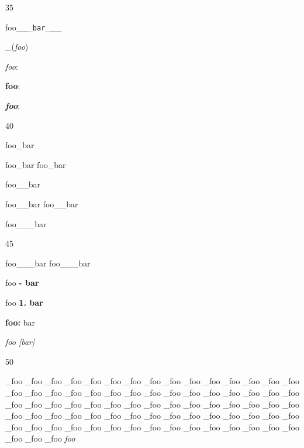 35

foo\_\_\texttt{\_bar\_}\_\_

\_(\emph{foo})

\emph{foo}:

\textbf{foo}:

\textbf{\emph{foo}}:

40

foo\_bar

foo\_bar foo\_bar

foo\_\_bar

foo\_\_bar foo\_\_bar

foo\_\_\_bar

45

foo\_\_\_bar foo\_\_\_bar

foo \textbf{- bar}

foo \textbf{1. bar}

\textbf{foo:} bar

\emph{foo [bar]}

50

\_foo
\_foo
\_foo
\_foo
\_foo
\_foo
\_foo
\_foo
\_foo
\_foo
\_foo
\_foo
\_foo
\_foo
\_foo
\_foo
\_foo
\_foo
\_foo
\_foo
\_foo
\_foo
\_foo
\_foo
\_foo
\_foo
\_foo
\_foo
\_foo
\_foo
\_foo
\_foo
\_foo
\_foo
\_foo
\_foo
\_foo
\_foo
\_foo
\_foo
\_foo
\_foo
\_foo
\_foo
\_foo
\_foo
\_foo
\_foo
\_foo
\_foo
\_foo
\_foo
\_foo
\_foo
\_foo
\_foo
\_foo
\_foo
\_foo
\_foo
\_foo
\_foo
\_foo
\_foo
\_foo
\_foo
\_foo
\_foo
\_foo
\_foo
\_foo
\_foo
\_foo
\_foo
\_foo
\_foo
\_foo
\_foo
\emph{foo}



